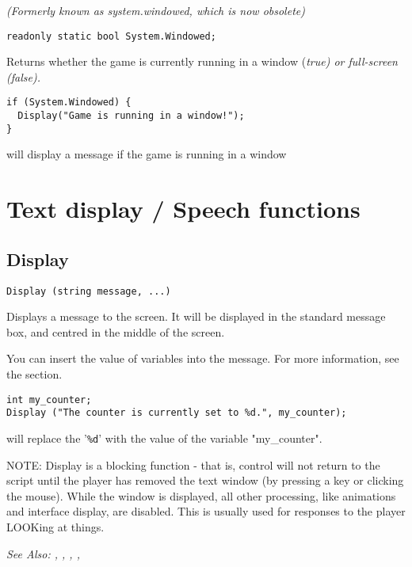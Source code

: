 \it{(Formerly known as system.windowed, which is now obsolete)}

\begin{verbatim}
readonly static bool System.Windowed;
\end{verbatim}
Returns whether the game is currently running in a window (\it{true}) or
full-screen (\it{false}).

\begin{verbatim}
if (System.Windowed) {
  Display("Game is running in a window!");
}
\end{verbatim}
will display a message if the game is running in a window




\section{Text display / Speech functions}%

\subsection{Display}\label{Display}%

\begin{verbatim}
Display (string message, ...)
\end{verbatim}
Displays a message to the screen. It will be displayed in the standard
message box, and centred in the middle of the screen.

You can insert the value of variables into the message. For more information,
see the  section.

\begin{verbatim}
int my_counter;
Display ("The counter is currently set to %d.", my_counter);
\end{verbatim}
will replace the '\verb$%d$' with the value of the variable "my_counter".

NOTE: Display is a blocking function - that is, control will not return
to the script until the player has removed the text window (by pressing a
key or clicking the mouse). While the window is displayed, all other
processing, like animations and interface display, are disabled. This is
usually used for responses to the player LOOKing at things.

\it{See Also:} , ,
, ,


